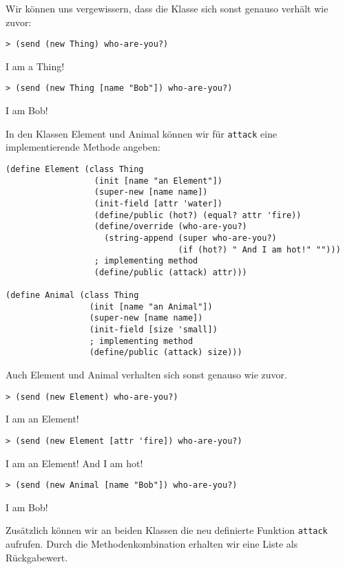Wir können uns vergewissern, dass die Klasse sich sonst genauso verhält wie zuvor:

\begin{lstlisting}
> (send (new Thing) who-are-you?)
\end{lstlisting}
{\routput {\qq}I am a Thing!\qq}

\begin{lstlisting}
> (send (new Thing [name "Bob"]) who-are-you?)
\end{lstlisting}
{\routput {\qq}I am Bob!\qq}

In den Klassen Element und Animal können wir für \texttt{attack} eine implementierende Methode angeben:

\begin{lstlisting}
(define Element (class Thing 
                  (init [name "an Element"])
                  (super-new [name name])
                  (init-field [attr 'water])
                  (define/public (hot?) (equal? attr 'fire))
                  (define/override (who-are-you?)
                    (string-append (super who-are-you?)
                                   (if (hot?) " And I am hot!" "")))
                  ; implementing method
                  (define/public (attack) attr)))
                  
(define Animal (class Thing
                 (init [name "an Animal"])
                 (super-new [name name])
                 (init-field [size 'small])
                 ; implementing method
                 (define/public (attack) size)))
\end{lstlisting}

Auch Element und Animal verhalten sich sonst genauso wie zuvor.

\begin{lstlisting}
> (send (new Element) who-are-you?)
\end{lstlisting}
{\routput {\qq}I am an Element!\qq}

\begin{lstlisting}
> (send (new Element [attr 'fire]) who-are-you?)
\end{lstlisting}
{\routput {\qq}I am an Element! And I am hot!\qq}

\begin{lstlisting}
> (send (new Animal [name "Bob"]) who-are-you?)
\end{lstlisting}
{\routput {\qq}I am Bob!\qq}

Zusätzlich können wir an beiden Klassen die neu definierte Funktion \texttt{attack} aufrufen. Durch die Methodenkombination erhalten wir eine Liste als Rückgabewert.

